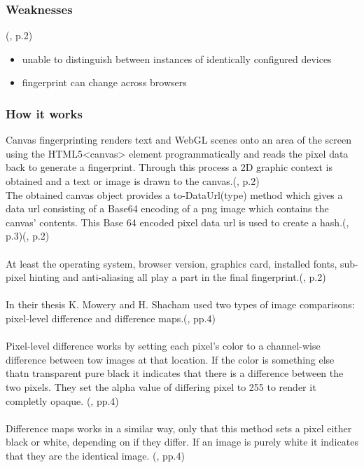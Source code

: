 \subsubsection{Weaknesses}
(\textcite{upi15}, p.2)
\begin{itemize}
	\item unable to distinguish between instances of identically configured devices
	\item fingerprint can change across browsers
\end{itemize}

\subsubsection{How it works}
Canvas fingerprinting renders text and WebGL scenes onto an area of the screen using the HTML5<canvas> element programmatically and reads the pixel data back to generate a fingerprint. Through this process a 2D graphic context is obtained and a text or image is drawn to the canvas.(\textcite{upi15}, p.2)\\
The obtained canvas object provides a to-DataUrl(type) method which gives a data url consisting of a Base64 encoding of a png image which contains the canvas' contents. This Base 64 encoded pixel data url is used to create a hash.(\textcite{mowery12}, p.3)(\textcite{upi15}, p.2)\\\\
At least the operating system, browser version, graphics card, installed fonts, sub-pixel hinting and anti-aliasing all play a part in the final fingerprint.(\textcite{upi15}, p.2) \\\\
In their thesis K. Mowery and H. Shacham used two types of image comparisons: pixel-level difference and difference maps.(\textcite{mowery12}, pp.4)\\\\
Pixel-level difference works by setting each pixel's color to a channel-wise difference between tow images at that location. If the color is something else thatn transparent pure black it indicates that there is a difference between the two pixels. They set the alpha value of differing pixel to 255 to render it completly opaque. (\textcite{mowery12}, pp.4)\\\\
Difference maps works in a similar way, only that this method sets a pixel either black or white, depending on if they differ. If an image is purely white it indicates that they are the identical image. (\textcite{mowery12}, pp.4)

